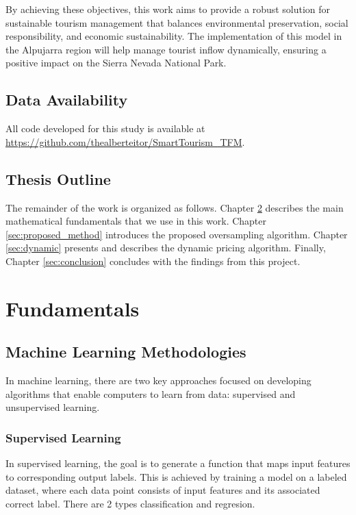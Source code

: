 \documentclass[12pt]{book}
\begin{document}
By achieving these objectives, this work aims to provide a robust solution for sustainable tourism management that balances environmental preservation, social responsibility, and economic sustainability. The implementation of this model in the Alpujarra region will help manage tourist inflow dynamically, ensuring a positive impact on the Sierra Nevada National Park.



\section*{Data Availability}

All code developed for this study is available at \url{https://github.com/thealberteitor/SmartTourism_TFM}.





\section{Thesis Outline} 

The remainder of the work is organized as follows. Chapter \ref{sec:fundamental} describes the main mathematical fundamentals that we use in this work. Chapter \ref{sec:proposed_method} introduces the proposed oversampling algorithm. Chapter \ref{sec:dynamic} presents and describes the dynamic pricing algorithm. Finally, Chapter \ref{sec:conclusion} concludes with the findings from this project.



\chapter{Fundamentals} \label{sec:fundamental}


\section{Machine Learning Methodologies}

In machine learning, there are two key approaches focused on developing algorithms that enable computers to learn from data: supervised and unsupervised learning. 



\subsection{Supervised Learning}

In supervised learning, the goal is to generate a function that maps input features to corresponding output labels. This is achieved by training a model on a labeled dataset, where each data point consists of input features and its associated correct label. There are 2 types classification and regresion. 
\end{document}
